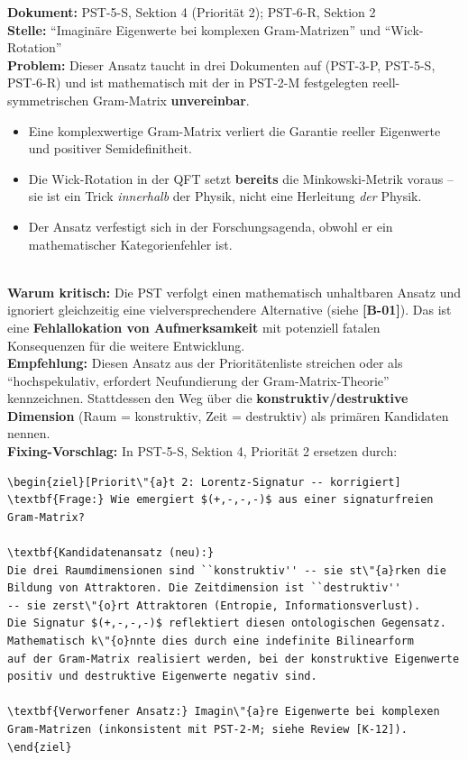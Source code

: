 \documentclass[11pt,a4paper]{article}
\newcommand{\Dok}[1]{\textbf{Dokument:} #1\\}
\newcommand{\Stelle}[1]{\textbf{Stelle:} #1\\}
\newcommand{\Prob}[1]{\textbf{Problem:} #1\\}
\newcommand{\Krit}[1]{\textbf{Warum kritisch:} #1\\}
\newcommand{\Empf}[1]{\textbf{Empfehlung:} #1\\}
\newcommand{\Fix}[1]{\textbf{Fixing-Vorschlag:} #1\\}
\begin{document}
\Dok{PST-5-S, Sektion 4 (Priorit\"{a}t 2); PST-6-R, Sektion 2}
\Stelle{``Imagin\"{a}re Eigenwerte bei komplexen Gram-Matrizen'' und
``Wick-Rotation''}
\Prob{Dieser Ansatz taucht in drei Dokumenten auf (PST-3-P, PST-5-S,
PST-6-R) und ist mathematisch mit der in PST-2-M festgelegten
reell-symmetrischen Gram-Matrix \textbf{unvereinbar}.
\begin{itemize}
  \item Eine komplexwertige Gram-Matrix verliert die Garantie
    reeller Eigenwerte und positiver Semidefinitheit.
  \item Die Wick-Rotation in der QFT setzt \textbf{bereits} die
    Minkowski-Metrik voraus -- sie ist ein Trick \emph{innerhalb}
    der Physik, nicht eine Herleitung \emph{der} Physik.
  \item Der Ansatz verfestigt sich in der Forschungsagenda, obwohl
    er ein mathematischer Kategorienfehler ist.
\end{itemize}}
\Krit{Die PST verfolgt einen mathematisch unhaltbaren Ansatz und
ignoriert gleichzeitig eine vielversprechendere Alternative (siehe
\textbf{[B-01]}). Das ist eine \textbf{Fehlallokation von
Aufmerksamkeit} mit potenziell fatalen Konsequenzen f\"{u}r die
weitere Entwicklung.}
\Empf{Diesen Ansatz aus der Priorit\"{a}tenliste streichen oder als
``hochspekulativ, erfordert Neufundierung der Gram-Matrix-Theorie''
kennzeichnen. Stattdessen den Weg \"{u}ber die
\textbf{konstruktiv/destruktive Dimension} (Raum = konstruktiv, Zeit
= destruktiv) als prim\"{a}ren Kandidaten nennen.}
\Fix{In PST-5-S, Sektion 4, Priorit\"{a}t 2 ersetzen durch:
\begin{verbatim}
\begin{ziel}[Priorit\"{a}t 2: Lorentz-Signatur -- korrigiert]
\textbf{Frage:} Wie emergiert $(+,-,-,-)$ aus einer signaturfreien
Gram-Matrix?

\textbf{Kandidatenansatz (neu):}
Die drei Raumdimensionen sind ``konstruktiv'' -- sie st\"{a}rken die
Bildung von Attraktoren. Die Zeitdimension ist ``destruktiv''
-- sie zerst\"{o}rt Attraktoren (Entropie, Informationsverlust).
Die Signatur $(+,-,-,-)$ reflektiert diesen ontologischen Gegensatz.
Mathematisch k\"{o}nnte dies durch eine indefinite Bilinearform
auf der Gram-Matrix realisiert werden, bei der konstruktive Eigenwerte
positiv und destruktive Eigenwerte negativ sind.

\textbf{Verworfener Ansatz:} Imagin\"{a}re Eigenwerte bei komplexen
Gram-Matrizen (inkonsistent mit PST-2-M; siehe Review [K-12]).
\end{ziel}
\end{verbatim}}
\end{document}
